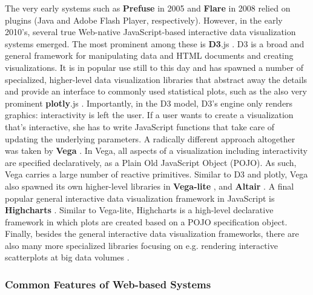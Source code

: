 \documentclass[12pt,a4paper]{article}
\begin{document}
The very early systems such as \textbf{Prefuse} in 2005 \citep{heer2005} and \textbf{Flare} in 2008 \citep{flare2020} relied on plugins (Java and Adobe Flash Player, respectively). However, in the early 2010's, several true Web-native JavaScript-based interactive data visualization systems emerged. The most prominent among these is \textbf{D3}.js \citep{bostock2011}. D3 is a broad and general framework for manipulating data and HTML documents and creating visualizations. It is in popular use still to this day and has spawned a number of specialized, higher-level data visualization libraries that abstract away the details and provide an interface to commonly used statistical plots, such as the also very prominent \textbf{plotly}.js \citep{plotly2022}. Importantly, in the D3 model, D3's engine only renders graphics: interactivity is left the user. If a user wants to create a visualization that's interactive, she has to write JavaScript functions that take care of updating the underlying parameters. A radically different approach altogether was taken by \textbf{Vega} \citep{satyanarayan2015}. In Vega, all aspects of a visualization including interactivity are specified declaratively, as a Plain Old JavaScript Object (POJO). As such, Vega carries a large number of reactive primitives. Similar to D3 and plotly, Vega also spawned its own higher-level libraries in \textbf{Vega-lite} \citep{satyanarayan2016}, and \textbf{Altair} \citep{vanderplas2018}. A final popular general interactive data visualization framework in JavaScript is \textbf{Highcharts} \citep{highcharts2023}. Similar to Vega-lite, Highcharts is a high-level declarative framework in which plots are created based on a POJO specification object. Finally, besides the general interactive data visualization frameworks, there are also many more specialized libraries focusing on e.g. rendering interactive scatterplots at big data volumes \citep[see e.g.][]{lekschas2023}.   

\subsubsection{Common Features of Web-based Systems}
\end{document}
